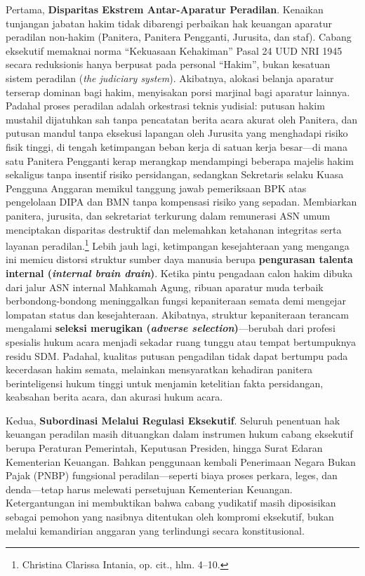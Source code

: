 \documentclass[12pt,a4paper,twocolumn]{article}
\begin{document}
Pertama, \textbf{Disparitas Ekstrem Antar-Aparatur Peradilan}. Kenaikan tunjangan jabatan hakim tidak dibarengi perbaikan hak keuangan aparatur peradilan non-hakim (Panitera, Panitera Pengganti, Jurusita, dan staf). Cabang eksekutif memaknai norma ``Kekuasaan Kehakiman'' Pasal 24 UUD NRI 1945 secara reduksionis hanya berpusat pada personal ``Hakim'', bukan kesatuan sistem peradilan (\textit{the judiciary system}). Akibatnya, alokasi belanja aparatur terserap dominan bagi hakim, menyisakan porsi marjinal bagi aparatur lainnya. Padahal proses peradilan adalah orkestrasi teknis yudisial: putusan hakim mustahil dijatuhkan sah tanpa pencatatan berita acara akurat oleh Panitera, dan putusan mandul tanpa eksekusi lapangan oleh Jurusita yang menghadapi risiko fisik tinggi, di tengah ketimpangan beban kerja di satuan kerja besar—di mana satu Panitera Pengganti kerap merangkap mendampingi beberapa majelis hakim sekaligus tanpa insentif risiko persidangan, sedangkan Sekretaris selaku Kuasa Pengguna Anggaran memikul tanggung jawab pemeriksaan BPK atas pengelolaan DIPA dan BMN tanpa kompensasi risiko yang sepadan. Membiarkan panitera, jurusita, dan sekretariat terkurung dalam remunerasi ASN umum menciptakan disparitas destruktif dan melemahkan ketahanan integritas serta layanan peradilan.\footnote{Christina Clarissa Intania, op. cit., hlm. 4--10.} Lebih jauh lagi, ketimpangan kesejahteraan yang menganga ini memicu distorsi struktur sumber daya manusia berupa \textbf{pengurasan talenta internal (\textit{internal brain drain})}. Ketika pintu pengadaan calon hakim dibuka dari jalur ASN internal Mahkamah Agung, ribuan aparatur muda terbaik berbondong-bondong meninggalkan fungsi kepaniteraan semata demi mengejar lompatan status dan kesejahteraan. Akibatnya, struktur kepaniteraan terancam mengalami \textbf{seleksi merugikan (\textit{adverse selection})}—berubah dari profesi spesialis hukum acara menjadi sekadar ruang tunggu atau tempat bertumpuknya residu SDM. Padahal, kualitas putusan pengadilan tidak dapat bertumpu pada kecerdasan hakim semata, melainkan mensyaratkan kehadiran panitera berinteligensi hukum tinggi untuk menjamin ketelitian fakta persidangan, keabsahan berita acara, dan akurasi hukum acara.

Kedua, \textbf{Subordinasi Melalui Regulasi Eksekutif}. Seluruh penentuan hak keuangan peradilan masih dituangkan dalam instrumen hukum cabang eksekutif berupa Peraturan Pemerintah, Keputusan Presiden, hingga Surat Edaran Kementerian Keuangan. Bahkan penggunaan kembali Penerimaan Negara Bukan Pajak (PNBP) fungsional peradilan—seperti biaya proses perkara, leges, dan denda—tetap harus melewati persetujuan Kementerian Keuangan. Ketergantungan ini membuktikan bahwa cabang yudikatif masih diposisikan sebagai pemohon yang nasibnya ditentukan oleh kompromi eksekutif, bukan melalui kemandirian anggaran yang terlindungi secara konstitusional.
\end{document}
